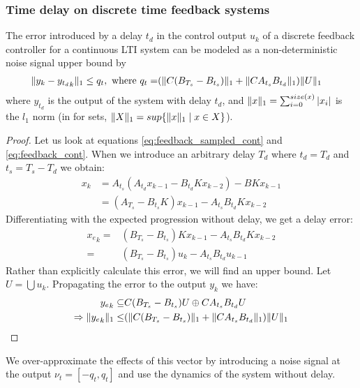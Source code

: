 \documentclass[a4paper,UKenglish]{lipics-v2018}
\DeclarePairedDelimiter\norm{\lVert}{\rVert}
\newcommand{\mat}[1]{{#1}}
\renewcommand{\vec}[1]{{#1}}
\begin{document}
\subsubsection{Time delay on discrete time feedback systems} \label{sec:delay}
\begin{theorem}
The error introduced by a delay $t_d$ in the control output $\vec{u}_k$ of a discrete feedback controller for a continuous LTI system can be modeled as a non-deterministic noise signal upper bound by 
\begin{align}
\norm{\vec{y}_{k}-{\vec{y}_{t_d}}_{k}}_1 \leq q_t, \text{ where } q_t=&(\norm{\mat{C}(\mat{B}_{T_s}-\mat{B}_{t_s})}_1+\norm{\mat{C}\mat{A}_{t_s}\mat{B}_{t_d}}_1)\norm{U}_1
\end{align}
where $\vec{y}_{t_d}$ is the output of the system with delay $t_d$, and $\norm{\vec{x}}_1=\sum_{i=0}^{size(\vec{x})} |\vec{x}_i|$ is the $l_1$ norm (in for sets, $\norm{X}_1 = sup \{\norm{\vec{x}}_1 \mid \vec{x} \in X\}$). 
\end{theorem}

\begin{proof}
Let us look at equations \eqref{eq:feedback_sampled_cont} and
\eqref{eq:feedback_cont}.  When we introduce an arbitrary delay $T_d$ where
$t_d=T_d$ and $t_s=T_s-T_d$ we obtain:
%
\begin{align*}
\vec{x}_{k} &=\mat{A}_{t_s}(\mat{A}_{t_d}\vec{x}_{k-1}-\mat{B}_{t_d}\mat{K}\vec{x}_{k-2})-\mat{B}\mat{K}\vec{x}_{k-1}\nonumber\\
&=  (\mat{A}_{T_s}-\mat{B}_{t_s}\mat{K})\vec{x}_{k-1}-\mat{A}_{t_s}\mat{B}_{t_d}\mat{K}\vec{x}_{k-2}
\label{eq:delay_cont}
\end{align*}
%
Differentiating with the expected progression without delay, we get a delay
error:
%
\begin{align*}
{\vec{x}_e}_{k}=&(\mat{B}_{T_s}-\mat{B}_{t_s})\mat{K}\vec{x}_{k-1}-\mat{A}_{t_s}\mat{B}_{t_d}\mat{K}\vec{x}_{k-2}\nonumber\\
=&(\mat{B}_{T_s}-\mat{B}_{t_s})\vec{u}_{k}-\mat{A}_{t_s}\mat{B}_{t_d}\vec{u}_{k-1}
\end{align*}
Rather than explicitly calculate this error, we will find an upper bound. Let $U = \bigcup \vec{u}_k$. Propagating the error to the output $\vec{y}_k$ we have:
\begin{align*}
{\vec{y}_e}_{k} \subseteq &\mat{C}(\mat{B}_{T_s}-\mat{B}_{t_s})U\oplus\mat{C}\mat{A}_{t_s}\mat{B}_{t_d}U\\
\Rightarrow \norm{{\vec{y}_e}_{k}}_1 \leq & (\norm{\mat{C}(\mat{B}_{T_s}-\mat{B}_{t_s})}_1+\norm{\mat{C}\mat{A}_{t_s}\mat{B}_{t_d}}_1)\norm{U}_1
\end{align*}
\end{proof}
We over-approximate the effects of this vector by introducing a noise signal at the output $\nu_t=[-q_t, q_t]$ and use the dynamics of the system without delay.
\end{document}

